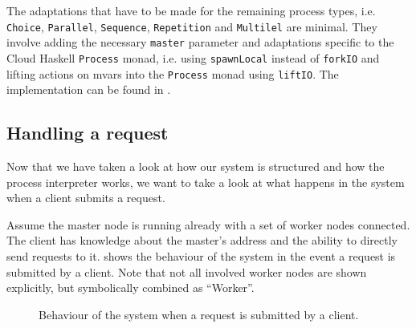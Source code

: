 The adaptations that have to be made for the remaining process types, i.e. \texttt{Choice}, \texttt{Parallel}, \texttt{Sequence}, \texttt{Repetition} and \texttt{Multilel} are minimal. They involve adding the necessary \texttt{master} parameter and adaptations specific to the \textsf{Cloud Haskell} \texttt{Process} monad, i.e. using \texttt{spawnLocal} instead of \texttt{forkIO} and lifting actions on mvars into the \texttt{Process} monad using \texttt{liftIO}. The implementation can be found in .


\subsection{Handling a request}
Now that we have taken a look at how our system is structured and how the process interpreter works, we want to take a look at what happens in the system when a client submits a request.

Assume the master node is running already with a set of worker nodes connected. The client has knowledge about the master's address and the ability to directly send requests to it.  shows the behaviour of the system in the event a request is submitted by a client. Note that not all involved worker nodes are shown explicitly, but symbolically combined as \enquote{Worker}.

\begin{figure}[h!]
  \centering
  
  \caption{Behaviour of the system when a request is submitted by a client.}
  \label{fig:request_handling}
\end{figure}

